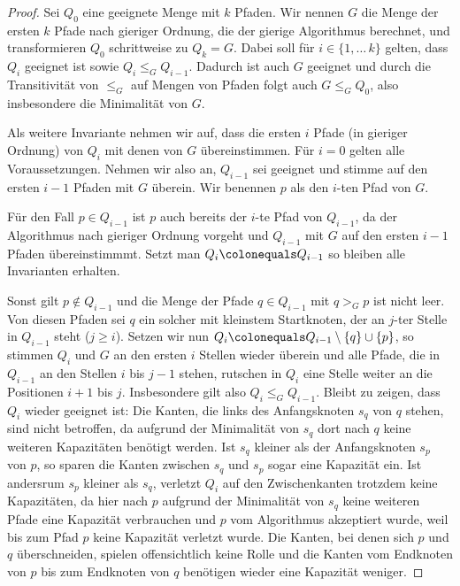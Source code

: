 \begin{proof}
    Sei $Q_0$ eine geeignete Menge mit $k$ Pfaden.
    Wir nennen $G$ die Menge der ersten $k$ Pfade nach gieriger Ordnung, die der gierige Algorithmus berechnet, und
    transformieren $Q_0$ schrittweise zu $Q_k = G$.
    Dabei soll für $i \in \{1,\dots\,k\}$ gelten, dass $Q_i$ geeignet ist sowie $Q_i \leq_G Q_{i-1}$.
    Dadurch ist auch $G$ geeignet und durch die Transitivität von $\leq_G$ auf Mengen von Pfaden folgt auch $G \leq_G Q_0$,
    also insbesondere die Minimalität von $G$.

    Als weitere Invariante nehmen wir auf, dass die ersten $i$ Pfade (in gieriger Ordnung) von $Q_i$ mit denen von $G$
    übereinstimmen.
    Für $i=0$ gelten alle Voraussetzungen.
    Nehmen wir also an, $Q_{i-1}$ sei geeignet und stimme auf den ersten $i-1$ Pfaden mit $G$ überein.
    Wir benennen $p$ als den $i$-ten Pfad von $G$.

    Für den Fall $p \in Q_{i-1}$ ist $p$ auch bereits der $i$-te Pfad von $Q_{i-1}$, da der Algorithmus nach
    gieriger Ordnung vorgeht und $Q_{i-1}$ mit $G$ auf den ersten $i-1$ Pfaden übereinstimmmt.
    Setzt man $Q_i \colonequals Q_{i-1}$ so bleiben alle Invarianten erhalten.

    Sonst gilt $p \notin Q_{i-1}$ und die Menge der Pfade $q \in Q_{i-1}$ mit $q >_G p$ ist nicht leer.
    Von diesen Pfaden sei $q$ ein solcher mit kleinstem Startknoten, der an $j$-ter Stelle in $Q_{i-1}$ steht
    ($j \geq i$).
    Setzen wir nun $Q_{i} \colonequals Q_{i-1} \setminus \{ q \} \cup \{ p \}$, so stimmen $Q_{i}$ und $G$ an den
    ersten $i$ Stellen wieder überein und alle Pfade, die in $Q_{i-1}$ an den Stellen $i$ bis $j-1$ stehen, rutschen
    in $Q_i$ eine Stelle weiter an die Positionen $i+1$ bis $j$.
    Insbesondere gilt also $Q_i \leq_G Q_{i-1}$.
    Bleibt zu zeigen, dass $Q_i$ wieder geeignet ist:
    Die Kanten, die links des Anfangsknoten $s_q$ von $q$ stehen, sind nicht betroffen, da aufgrund der Minimalität
    von $s_q$ dort nach $q$ keine weiteren Kapazitäten benötigt werden.
    Ist $s_q$ kleiner als der Anfangsknoten $s_p$ von $p$, so sparen die Kanten zwischen $s_q$ und $s_p$ sogar eine
    Kapazität ein.
    Ist andersrum $s_p$ kleiner als $s_q$, verletzt $Q_i$ auf den Zwischenkanten trotzdem keine Kapazitäten, da
    hier nach $p$ aufgrund der Minimalität von $s_q$ keine weiteren Pfade eine Kapazität verbrauchen und $p$ vom
    Algorithmus akzeptiert wurde, weil bis zum Pfad $p$ keine Kapazität verletzt wurde.
    Die Kanten, bei denen sich $p$ und $q$ überschneiden, spielen offensichtlich keine Rolle und die Kanten
    vom Endknoten von $p$ bis zum Endknoten von $q$ benötigen wieder eine Kapazität weniger.
\end{proof}

